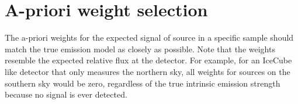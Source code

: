 
\section{A-priori weight selection}
The a-priori weights for the expected signal of source in a specific sample should match the true emission model as closely as possible.
Note that the weights resemble the expected relative flux at the detector.
For example, for an IceCube like detector that only measures the northern sky, all weights for sources on the southern sky would be zero, regardless of the true intrinsic emission strength because no signal is ever detected.

